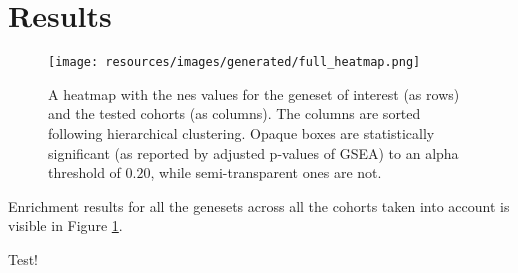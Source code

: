 \section{Results}

\begin{figure}
    \centering
    \texttt{[image: resources/images/generated/full\_heatmap.png]}
    \caption{A heatmap with the \gls{nes} values for the geneset of interest (as rows) and the tested cohorts (as columns). The columns are sorted following hierarchical clustering. Opaque boxes are statistically significant (as reported by adjusted p-values of GSEA) to an alpha threshold of $0.20$, while semi-transparent ones are not.}
    \label{fig:full_enrichment_heatmap}
\end{figure}

Enrichment results for all the genesets across all the cohorts taken into account is visible in Figure \ref{fig:full_enrichment_heatmap}.


Test!